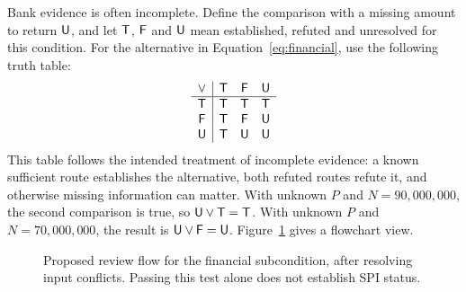 Bank evidence is often incomplete. Define the comparison with a missing amount
to return $\mathsf{U}$, and let $\mathsf{T}$, $\mathsf{F}$ and $\mathsf{U}$ mean established,
refuted and unresolved for this condition. For the alternative in
Equation~\eqref{eq:financial}, use the following truth table:
\begin{equation}
\begin{array}{c|ccc}
\lor & \mathsf{T} & \mathsf{F} & \mathsf{U}\\\hline
\mathsf{T} & \mathsf{T} & \mathsf{T} & \mathsf{T}\\
\mathsf{F} & \mathsf{T} & \mathsf{F} & \mathsf{U}\\
\mathsf{U} & \mathsf{T} & \mathsf{U} & \mathsf{U}
\end{array}
\label{eq:or}
\end{equation}
This table follows the intended treatment of incomplete evidence: a known
sufficient route establishes the alternative, both refuted routes refute it,
and otherwise missing information can matter. With unknown $P$ and
$N=90{,}000{,}000$, the second comparison is true, so
$\mathsf{U}\lor\mathsf{T}=\mathsf{T}$. With unknown $P$ and $N=70{,}000{,}000$, the result
is $\mathsf{U}\lor\mathsf{F}=\mathsf{U}$. Figure~\ref{fig:financial-flow} gives a
flowchart view.

\begin{figure}[!htbp]
\centering
{}
\caption{Proposed review flow for the financial subcondition, after resolving
input conflicts. Passing this test alone does not establish SPI status.}
\label{fig:financial-flow}
\end{figure}

